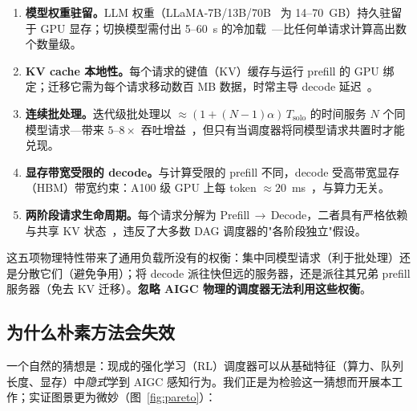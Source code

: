 \begin{enumerate}
\item \textbf{模型权重驻留。}LLM 权重（LLaMA-7B/13B/70B~\cite{touvron2023llama} 为 14--70~GB）持久驻留于 GPU 显存；切换模型需付出 5--60~s 的冷加载~\cite{fu2024serverlessllm}---比任何单请求计算高出数个数量级。

\item \textbf{KV cache 本地性。}每个请求的键值（KV）缓存与运行 prefill 的 GPU 绑定；迁移它需为每个请求移动数百 MB 数据，时常主导 decode 延迟~\cite{patel2024splitwise,kwon2023vllm}。

\item \textbf{连续批处理。}迭代级批处理以 ${\approx}(1 + (N-1)\alpha)\,T_{\text{solo}}$ 的时间服务 $N$ 个同模型请求---带来 $5$--$8\times$ 吞吐增益~\cite{yu2022orca,kwon2023vllm}，但只有当调度器将同模型请求共置时才能兑现。

\item \textbf{显存带宽受限的 decode。}与计算受限的 prefill 不同，decode 受高带宽显存（HBM）带宽约束：A100 级 GPU 上每 token ${\approx}20$~ms~\cite{patel2024splitwise,agrawal2024sarathi}，与算力无关。

\item \textbf{两阶段请求生命周期。}每个请求分解为 Prefill$\,\to\,$Decode，二者具有严格依赖与共享 KV 状态~\cite{zhong2024distserve}，违反了大多数 DAG 调度器的"各阶段独立"假设。
\end{enumerate}

这五项物理特性带来了通用负载所没有的权衡：集中同模型请求（利于批处理）还是分散它们（避免争用）；将 decode 派往快但远的服务器，还是派往其兄弟 prefill 服务器（免去 KV 迁移）。\textbf{忽略 AIGC 物理的调度器无法利用这些权衡}。

\subsection{为什么朴素方法会失效}

一个自然的猜想是：现成的强化学习（RL）调度器可以从基础特征（算力、队列长度、显存）中\emph{隐式}学到 AIGC 感知行为。我们正是为检验这一猜想而开展本工作；实证图景更为微妙（图~\ref{fig:pareto}）：

